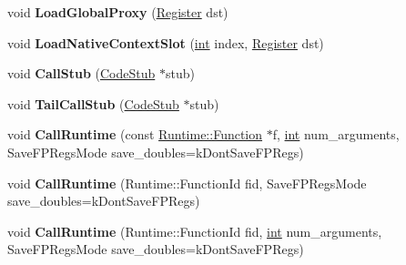 \begin{DoxyCompactItemize}
\mbox{\label{classv8_1_1internal_1_1MacroAssembler_a8139c3ce1dd60f65909755011ef7f9d1}} 
void {\bfseries Load\+Global\+Proxy} (\mbox{\hyperlink{classv8_1_1internal_1_1Register}{Register}} dst)
\item 
\mbox{\label{classv8_1_1internal_1_1MacroAssembler_abb9c73f938328171318c7cc010a7b53c}} 
void {\bfseries Load\+Native\+Context\+Slot} (\mbox{\hyperlink{classint}{int}} index, \mbox{\hyperlink{classv8_1_1internal_1_1Register}{Register}} dst)
\item 
\mbox{\label{classv8_1_1internal_1_1MacroAssembler_a6775ba7dd62249b4bd7b668d6f4c1963}} 
void {\bfseries Call\+Stub} (\mbox{\hyperlink{classv8_1_1internal_1_1CodeStub}{Code\+Stub}} $\ast$stub)
\item 
\mbox{\label{classv8_1_1internal_1_1MacroAssembler_a5255a8669ff98768dee25f5cee80363a}} 
void {\bfseries Tail\+Call\+Stub} (\mbox{\hyperlink{classv8_1_1internal_1_1CodeStub}{Code\+Stub}} $\ast$stub)
\item 
\mbox{\label{classv8_1_1internal_1_1MacroAssembler_a37081c297a4c533e549cc58167f7ccaa}} 
void {\bfseries Call\+Runtime} (const \mbox{\hyperlink{structv8_1_1internal_1_1Runtime_1_1Function}{Runtime\+::\+Function}} $\ast$f, \mbox{\hyperlink{classint}{int}} num\+\_\+arguments, Save\+F\+P\+Regs\+Mode save\+\_\+doubles=k\+Dont\+Save\+F\+P\+Regs)
\item 
\mbox{\label{classv8_1_1internal_1_1MacroAssembler_a797b53d578cd762b40c56f4485bf584e}} 
void {\bfseries Call\+Runtime} (Runtime\+::\+Function\+Id fid, Save\+F\+P\+Regs\+Mode save\+\_\+doubles=k\+Dont\+Save\+F\+P\+Regs)
\item 
\mbox{\label{classv8_1_1internal_1_1MacroAssembler_a87a8fd8a93b463d8485753c6d0d0465e}} 
void {\bfseries Call\+Runtime} (Runtime\+::\+Function\+Id fid, \mbox{\hyperlink{classint}{int}} num\+\_\+arguments, Save\+F\+P\+Regs\+Mode save\+\_\+doubles=k\+Dont\+Save\+F\+P\+Regs)
\item 
\mbox{\label{classv8_1_1internal_1_1MacroAssembler_aefb569829758555a7394ce1d34ed2bef}} 

\end{DoxyCompactItemize}
